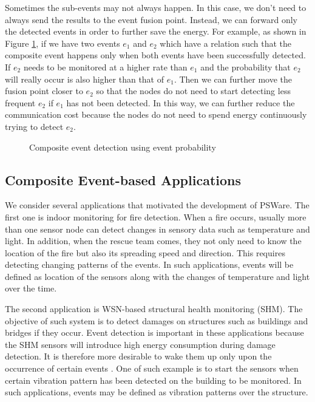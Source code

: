 Sometimes the sub-events may not always happen. In this case, we don't need to always send the results to the event fusion point. Instead, we can forward only the detected events in order to further save the energy. For example, as shown in Figure \ref{fig:event-detection3}, if we have two events \(e_1\) and \(e_2\) which have a relation such that the composite event happens only when both events have been successfully detected. If \(e_2\) needs to be monitored at a higher rate than \(e_1\) and the probability that \(e_2\) will really occur is also higher than that of \(e_1\). Then we can further move the fusion point closer to \(e_2\) so that the nodes do not need to start detecting less frequent \(e_2\) if \(e_1\) has not been detected. In this way, we can further reduce the communication cost because the nodes do not need to spend energy continuously trying to detect \(e_2\).

\begin{figure}
\centering
{}
\caption{Composite event detection using event probability}
\label{fig:event-detection3}
\end{figure}

\subsection{Composite Event-based Applications}
We consider several applications that motivated the development of PSWare. The first one is indoor monitoring for fire detection. When a fire occurs, usually more than one sensor node can detect changes in sensory data such as temperature and light. In addition, when the rescue team comes, they not only need to know the location of the fire but also its spreading speed and direction. This requires detecting changing patterns of the events. In such applications, events will be defined as location of the sensors along with the changes of temperature and light over the time.

The second application is WSN-based structural health monitoring (SHM). The objective of such system is to detect damages on structures such as buildings and bridges if they occur. Event detection is important in these applications because the SHM sensors will introduce high energy consumption during damage detection. It is therefore more desirable to wake them up only upon the occurrence of certain events \cite{jangshm}. One of such example is to start the sensors when certain vibration pattern has been detected on the building to be monitored. In such applications, events may be defined as vibration patterns over the structure.

